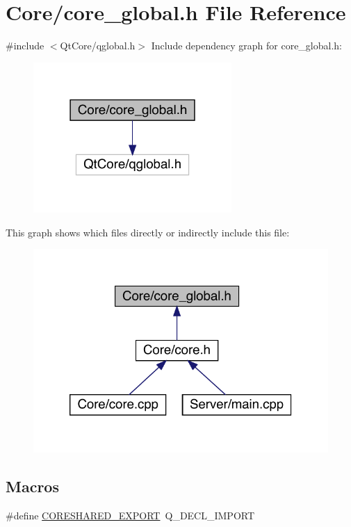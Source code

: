 \hypertarget{a00017}{}\section{Core/core\+\_\+global.h File Reference}
\label{a00017}
{\ttfamily \#include $<$Qt\+Core/qglobal.\+h$>$}\newline
Include dependency graph for core\+\_\+global.\+h\+:
\nopagebreak
\begin{figure}[H]
\begin{center}
\leavevmode
\includegraphics[width=214pt]{d1/d2b/a00018}
\end{center}
\end{figure}
This graph shows which files directly or indirectly include this file\+:
\nopagebreak
\begin{figure}[H]
\begin{center}
\leavevmode
\includegraphics[width=320pt]{dd/da2/a00019}
\end{center}
\end{figure}
\subsection*{Macros}
\begin{DoxyCompactItemize}
\item 
\#define \hyperlink{a00017_a35b4f560a49976697e57858385e52c17}{C\+O\+R\+E\+S\+H\+A\+R\+E\+D\+\_\+\+E\+X\+P\+O\+RT}~Q\+\_\+\+D\+E\+C\+L\+\_\+\+I\+M\+P\+O\+RT
\end{DoxyCompactItemize}


